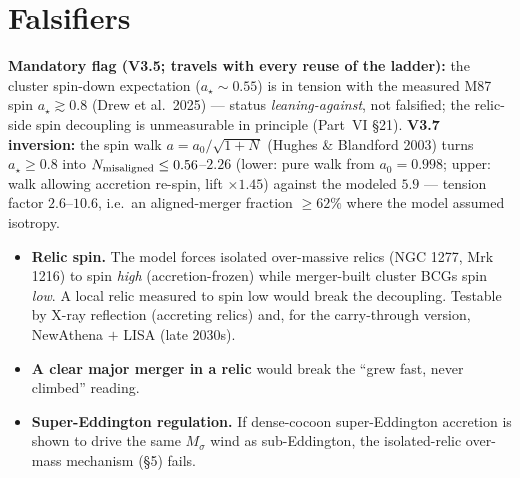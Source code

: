 \documentclass[11pt]{article}
\newcommand{\Msig}{M_\sigma}
\begin{document}
\section{Falsifiers}
\noindent\textbf{Mandatory flag (V3.5; travels with every reuse of the ladder):} the cluster spin-down expectation ($a_\star\sim0.55$) is in tension with the measured M87 spin $a_\star\gtrsim0.8$ (Drew et al.\ 2025) --- status \emph{leaning-against}, not falsified; the relic-side spin decoupling is unmeasurable in principle (Part~VI \S21). \textbf{V3.7 inversion:} the spin walk $a=a_0/\sqrt{1+N}$ (Hughes \& Blandford 2003) turns $a_\star\ge0.8$ into $N_{\rm misaligned}\le0.56$--$2.26$ (lower: pure walk from $a_0=0.998$; upper: walk allowing accretion re-spin, lift $\times1.45$) against the modeled $5.9$ --- tension factor $2.6$--$10.6$, i.e.\ an aligned-merger fraction $\ge62\%$ where the model assumed isotropy.
\begin{itemize}[leftmargin=1.3em,itemsep=2pt]
\item \textbf{Relic spin.} The model forces isolated over-massive relics (NGC 1277, Mrk 1216) to spin \emph{high} (accretion-frozen) while merger-built cluster BCGs spin \emph{low}. A local relic measured to spin low would break the decoupling. Testable by X-ray reflection (accreting relics) and, for the carry-through version, NewAthena $+$ LISA (late 2030s).
\item \textbf{A clear major merger in a relic} would break the ``grew fast, never climbed'' reading.
\item \textbf{Super-Eddington regulation.} If dense-cocoon super-Eddington accretion is shown to drive the same $\Msig$ wind as sub-Eddington, the isolated-relic over-mass mechanism (\S5) fails.
\end{itemize}

\end{document}
